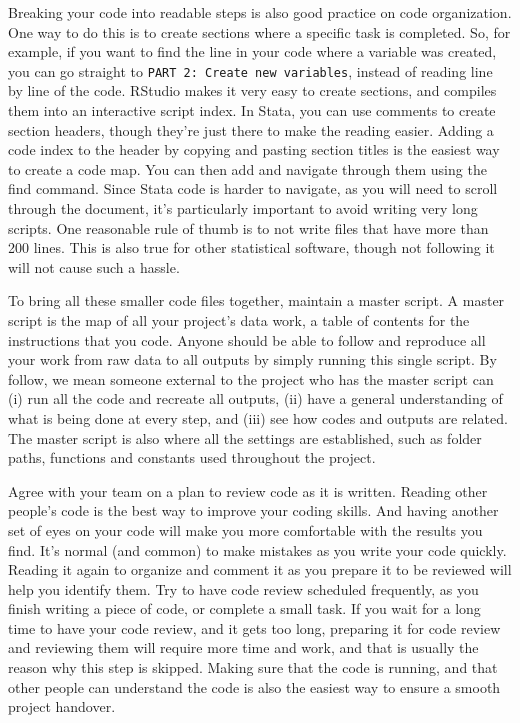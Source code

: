 Breaking your code into readable steps is also good practice on code organization.
One way to do this is to create sections where a specific task is completed.
So, for example, if you want to find the line in your code where a variable was created,
you can go straight to \texttt{PART 2: Create new variables},
instead of reading line by line of the code.
RStudio makes it very easy to create sections, and compiles them into an interactive script index.
In Stata, you can use comments to create section headers,
though they're just there to make the reading easier.
Adding a code index to the header by copying and pasting section titles is the easiest way to create a code map.
You can then add and navigate through them using the find command.
Since Stata code is harder to navigate, as you will need to scroll through the document,
it's particularly important to avoid writing very long scripts.
One reasonable rule of thumb is to not write files that have more than 200 lines.
This is also true for other statistical software,
though not following it will not cause such a hassle.


To bring all these smaller code files together, maintain a master script.
A master script is the map of all your project's data work,
a table of contents for the instructions that you code.
Anyone should be able to follow and reproduce all your work from
raw data to all outputs by simply running this single script.
By follow, we mean someone external to the project who has the master script can
(i) run all the code and recreate all outputs,
(ii) have a general understanding of what is being done at every step, and
(iii) see how codes and outputs are related.
The master script is also where all the settings are established,
such as folder paths, functions and constants used throughout the project.

Agree with your team on a plan to review code as it is written.
Reading other people's code is the best way to improve your coding skills.
And having another set of eyes on your code will make you more comfortable with the results you find.
It's normal (and common) to make mistakes as you write your code quickly.
Reading it again to organize and comment it as you prepare it to be reviewed will help you identify them.
Try to have code review scheduled frequently, as you finish writing a piece of code, or complete a small task.
If you wait for a long time to have your code review, and it gets too long,
preparing it for code review and reviewing them will require more time and work,
and that is usually the reason why this step is skipped.
Making sure that the code is running,
and that other people can understand the code is also the easiest way to ensure a smooth project handover.

